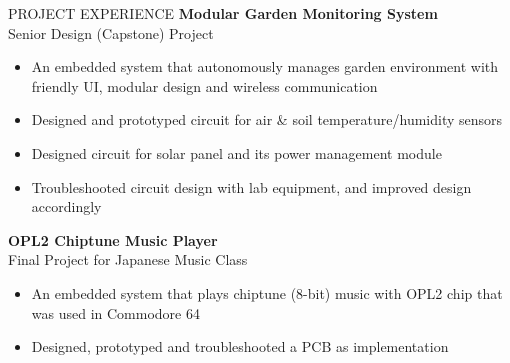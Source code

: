 \documentclass{../lib/resume} %
\begin{document}
	
	\begin{rSection}{PROJECT EXPERIENCE}
		\textbf{Modular Garden Monitoring System} \\
		Senior Design (Capstone) Project
		\begin{itemize}
			\itemsep -4pt {} 
			\item An embedded system that autonomously manages garden environment with friendly UI, modular design and wireless communication
			\item Designed and prototyped circuit for air \& soil temperature/humidity sensors
			\item Designed circuit for solar panel and its power management module
			\item Troubleshooted circuit design with lab equipment, and improved design accordingly
		\end{itemize}

		\textbf{OPL2 Chiptune Music Player} \\
		Final Project for Japanese Music Class
		\begin{itemize}
			\itemsep -4pt {} 
			\item An embedded system that plays chiptune (8-bit) music with OPL2 chip that was used in Commodore 64
			\item Designed, prototyped and troubleshooted a PCB as implementation
		\end{itemize}
		
	\end{rSection} 
	
%		
%		
%	
%		
%		
	
	
\end{document}
